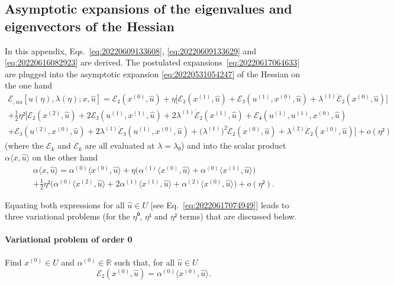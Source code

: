 \documentclass[12pt, final]{scrartcl}
\theoremstyle{definition}
\newcommand{\order}[2][1]{#2^{(#1)}}
\newcommand{\reals}{\mathbb{R}}
\begin{document}
\subsection{Asymptotic expansions of the eigenvalues and eigenvectors of the Hessian}
\label{sec:20220616074108}

In this appendix, Eqs.~\eqref{eq:20220609133608}, \eqref{eq:20220609133629} and
\eqref{eq:20220616082923} are derived. The postulated
expansions~\eqref{eq:20220617064633} are plugged into the asymptotic expansion
\eqref{eq:20220531054247} of the Hessian on the one hand
\begin{multline*}
  ℰ_{, uu} [u(η), λ(η); x, \hat{u}] = ℰ₂(\order[0]x, \hat{u}) + η \bigl[ ℰ₂(\order[1]x, \hat{u}) + ℰ₃(\order[1]u, \order[0]x, \hat{u}) + \order[1]λ \dot{ℰ}₂(\order[0]x, \hat{u})\bigr]\\
  + \tfrac{1}{2} η² \bigl[ℰ₂(\order[2]x, \hat{u}) + 2ℰ₃(\order[1]u, \order[1]x, \hat{u}) + 2 \order[1]λ \dot{ℰ}₂(\order[1]x, \hat{u}) + ℰ₄(\order[1]u, \order[1]u, \order[0]x, \hat{u})\\
  + ℰ₃(\order[2]u, \order[0]x, \hat{u}) + 2\order[1]λ \dot{ℰ}₃(\order[1]u, \order[0]x, \hat{u}) + \bigl( \order[1]λ \bigr)^2 \ddot{ℰ}₂(\order[0]x, \hat{u}) + \order[2]λ \dot{ℰ}₂(\order[0]x, \hat{u}) \bigr] + o(η²)
\end{multline*}
(where the \(ℰ_k\) and \(\dot{ℰ}_k\) are all evaluated at \(λ=λ₀\)) and into the
scalar product \(α 〈 x, \hat{u} 〉\) on the other hand
\begin{multline*}
    α 〈 x, \hat{u} 〉 = \order[0]α 〈 \order[0]x, \hat{u} 〉 + η \bigl(\order[1]α 〈 \order[0]x, \hat{u} 〉 + \order[0]α 〈 \order[1]x, \hat{u} 〉\bigr)\\
    + \tfrac{1}{2} η² \bigl(\order[0]α 〈 \order[2]x, \hat{u} 〉 + 2 \order[1]α 〈 \order[1]x, \hat{u} 〉 + \order[2]α 〈 \order[0]x, \hat{u} 〉\bigr) + o(η²).
\end{multline*}

Equating both expressions for all \(\hat{u} ∈ U\) [see
Eq.~\eqref{eq:20220617074949}] leads to three variational problems (for the
\(η⁰\), \(η¹\) and \(η²\) terms) that are discussed below.

\paragraph{Variational problem of order 0} Find \(\order[0]x∈U\) and \(\order[0]α∈\reals\) such
that, for all \(\hat{u}∈U\)
\begin{equation*}
  ℰ₂(\order[0]x, \hat{u}) = \order[0]α 〈 \order[0]x, \hat{u} 〉.
\end{equation*}
\end{document}
